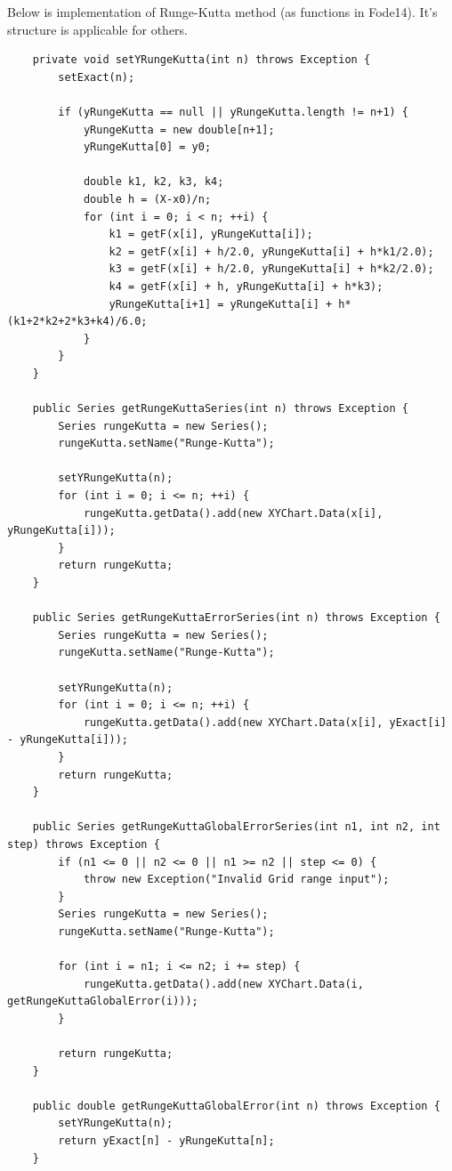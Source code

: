 Below is implementation of Runge-Kutta method (as functions in Fode14). It's structure is applicable for others.
\begin{lstlisting}
    private void setYRungeKutta(int n) throws Exception {
        setExact(n);
        
        if (yRungeKutta == null || yRungeKutta.length != n+1) {
            yRungeKutta = new double[n+1];
            yRungeKutta[0] = y0;

            double k1, k2, k3, k4;
            double h = (X-x0)/n;
            for (int i = 0; i < n; ++i) {
                k1 = getF(x[i], yRungeKutta[i]);
                k2 = getF(x[i] + h/2.0, yRungeKutta[i] + h*k1/2.0);
                k3 = getF(x[i] + h/2.0, yRungeKutta[i] + h*k2/2.0);
                k4 = getF(x[i] + h, yRungeKutta[i] + h*k3);
                yRungeKutta[i+1] = yRungeKutta[i] + h*(k1+2*k2+2*k3+k4)/6.0;
            }
        }
    }
    
    public Series getRungeKuttaSeries(int n) throws Exception {
        Series rungeKutta = new Series();
        rungeKutta.setName("Runge-Kutta");
        
        setYRungeKutta(n);
        for (int i = 0; i <= n; ++i) {
            rungeKutta.getData().add(new XYChart.Data(x[i], yRungeKutta[i]));
        }
        return rungeKutta;
    }
    
    public Series getRungeKuttaErrorSeries(int n) throws Exception {
        Series rungeKutta = new Series();
        rungeKutta.setName("Runge-Kutta");
        
        setYRungeKutta(n);
        for (int i = 0; i <= n; ++i) {
            rungeKutta.getData().add(new XYChart.Data(x[i], yExact[i] - yRungeKutta[i]));
        }
        return rungeKutta;
    }
    
    public Series getRungeKuttaGlobalErrorSeries(int n1, int n2, int step) throws Exception {
        if (n1 <= 0 || n2 <= 0 || n1 >= n2 || step <= 0) {
            throw new Exception("Invalid Grid range input");
        }
        Series rungeKutta = new Series();
        rungeKutta.setName("Runge-Kutta");
        
        for (int i = n1; i <= n2; i += step) {
            rungeKutta.getData().add(new XYChart.Data(i, getRungeKuttaGlobalError(i)));
        }
        
        return rungeKutta;
    }
    
    public double getRungeKuttaGlobalError(int n) throws Exception {
        setYRungeKutta(n);
        return yExact[n] - yRungeKutta[n];
    }
\end{lstlisting}
